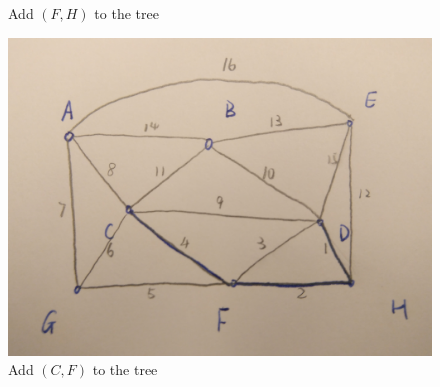 \documentclass[11pt]{article}
\begin{document}
\begin{figure}[H]
\begin{minipage}[t]{0.50\linewidth}
		\caption{Add $(F,H)$ to the tree}
		\label{fig:subfig1:c}
	\end{minipage}
	\begin{minipage}[t]{0.50\linewidth}
		\centering
		\includegraphics[width=0.85\linewidth]{Figure/1a4.jpg}
		\caption{Add $(C,F)$ to the tree}
		\label{fig:subfig1:d}
	\end{minipage}
\end{figure}
\end{document}

